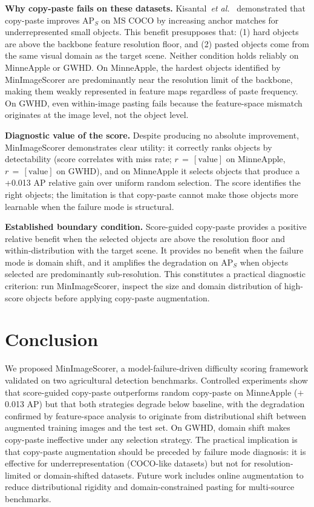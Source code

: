 \documentclass[conference]{IEEEtran}
\begin{document}
\textbf{Why copy-paste fails on these datasets.}
Kisantal~\textit{et al.}~\cite{kisantal2019augmentation}
demonstrated that copy-paste improves AP$_S$ on MS COCO
by increasing anchor matches for underrepresented small
objects. This benefit presupposes that: (1) hard objects
are above the backbone feature resolution floor, and
(2) pasted objects come from the same visual domain as
the target scene. Neither condition holds reliably on
MinneApple or GWHD. On MinneApple, the hardest objects
identified by MinImageScorer are predominantly
near the resolution limit of the backbone, making them
weakly represented in feature maps regardless of paste
frequency. On GWHD, even within-image pasting fails
because the feature-space mismatch originates at the
image level, not the object level.

\textbf{Diagnostic value of the score.}
Despite producing no absolute improvement, MinImageScorer
demonstrates clear utility: it correctly ranks objects
by detectability (score correlates with miss rate;
$r\,{=}\,[\text{value}]$ on MinneApple,
$r\,{=}\,[\text{value}]$ on GWHD),
and on MinneApple it selects objects that produce
a +0.013 AP relative gain over uniform random selection.
The score identifies the right objects; the limitation is
that copy-paste cannot make those objects more learnable
when the failure mode is structural.

\textbf{Established boundary condition.}
Score-guided copy-paste provides a positive relative
benefit when the selected objects are above the
resolution floor and within-distribution with the target
scene. It provides no benefit when the failure mode is
domain shift, and it amplifies the degradation on
AP$_S$ when objects selected are predominantly
sub-resolution. This constitutes a practical
diagnostic criterion: run MinImageScorer, inspect the
size and domain distribution of high-score objects
before applying copy-paste augmentation.

\section{Conclusion}

We proposed MinImageScorer, a model-failure-driven
difficulty scoring framework validated on two
agricultural detection benchmarks. Controlled experiments
show that score-guided copy-paste outperforms random
copy-paste on MinneApple ($+$0.013 AP) but that both
strategies degrade below baseline, with the degradation
confirmed by feature-space analysis to originate from
distributional shift between augmented training images
and the test set. On GWHD, domain shift makes copy-paste
ineffective under any selection strategy.
The practical implication is that copy-paste augmentation
should be preceded by failure mode diagnosis: it is
effective for underrepresentation (COCO-like datasets)
but not for resolution-limited or domain-shifted datasets.
Future work includes online augmentation to reduce
distributional rigidity and domain-constrained pasting
for multi-source benchmarks.
\end{document}

